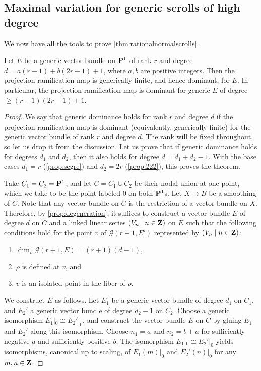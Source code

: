 \subsection{Maximal variation for generic scrolls of high degree}\label{sec:llsproof}
We now have all the tools to prove \autoref{thm:rationalnormalscrolls}.
\begin{theorem}
  \label{thm:actualrationalnormalscrolls}
  Let $E$ be a generic vector bundle on $\P^1$ of rank $r$ and degree $d = a(r-1) + b(2r-1)+1$, where $a, b$ are positive integers.
  Then the projection-ramification map is generically finite, and hence dominant, for $E$.
  In particular, the projection-ramification map is dominant for generic $E$ of degree $\geq (r-1)(2r-1)+1$.
\end{theorem}
\begin{proof}
  We say that generic dominance holds for rank $r$ and degree $d$ if the projection-ramification map is dominant (equivalently, generically finite) for the generic vector bundle of rank $r$ and degree $d$.
  The rank will be fixed throughout, so let us drop it from the discussion.
  Let us prove that if generic dominance holds for degrees $d_1$ and $d_2$, then it also holds for degree $d = d_1 + d_2 - 1 $.
  With the base cases $d_1 = r$ (\autoref{prop:segre}) and $d_2 = 2r$ (\autoref{prop:222}), this proves the theorem.

  Take $C_1 = C_2 = \P^1$, and let $C = C_1 \cup C_2$ be their nodal union at one point, which we take to be the point labeled $0$ on both $\P^1$s.
  Let $X \to B$ be a smoothing of $C$.
  Note that any vector bundle on $C$ is the restriction of a vector bundle on $X$.
  Therefore, by \autoref{prop:degeneration}, it suffices to construct a vector bundle $E$ of degree $d$ on $C$ and a linked linear series $(V_n \mid n \in \Z)$ on $E$ such that the following conditions hold for the point $v$ of $\mathcal G (r+1, E')$ represented by $(V_n \mid n \in \Z)$:
  \begin{enumerate}
  \item $\dim_v \mathcal G(r+1, E) = (r+1)(d-1)$,
  \item $\rho$ is defined at $v$, and
  \item $v$ is an isolated point in the fiber of $\rho$.
  \end{enumerate}

  We construct $E$ as follows.
  Let $E_1$ be a generic vector bundle of degree $d_1$ on $C_1$, and $E_2'$ a generic vector bundle of degree $d_2 - 1$ on $C_2$.
  Choose a generic isomorphism $E_1|_0 \cong E_2'|_0$, and construct the vector bundle $E$ on $C$ by gluing $E_1$ and $E_2'$ along this isomorphism.
  Choose $n_1 = a$ and $n_2 = b+a$ for sufficiently negative $a$ and sufficiently positive $b$.
  The isomorphism $E_1 |_0 \cong E_2'|_0$ yields isomorphisms, canonical up to scaling, of $E_1(m)|_0$ and $E_2'(n)|_0$ for any $m, n \in \Z$.


\end{proof}

